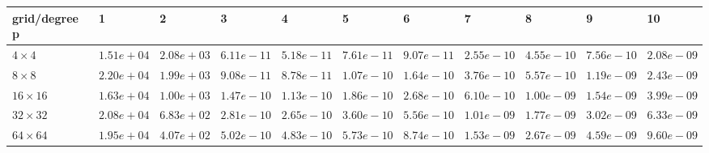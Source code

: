 \begin{tabular}{lllllllllll}
\hline
 grid/degree p   & 1          & 2          & 3          & 4          & 5          & 6          & 7          & 8          & 9          & 10         \\
\hline
 $4 \times 4$    & $1.51e+04$ & $2.08e+03$ & $6.11e-11$ & $5.18e-11$ & $7.61e-11$ & $9.07e-11$ & $2.55e-10$ & $4.55e-10$ & $7.56e-10$ & $2.08e-09$ \\
 $8 \times 8$    & $2.20e+04$ & $1.99e+03$ & $9.08e-11$ & $8.78e-11$ & $1.07e-10$ & $1.64e-10$ & $3.76e-10$ & $5.57e-10$ & $1.19e-09$ & $2.43e-09$ \\
 $16 \times 16$  & $1.63e+04$ & $1.00e+03$ & $1.47e-10$ & $1.13e-10$ & $1.86e-10$ & $2.68e-10$ & $6.10e-10$ & $1.00e-09$ & $1.54e-09$ & $3.99e-09$ \\
 $32 \times 32$  & $2.08e+04$ & $6.83e+02$ & $2.81e-10$ & $2.65e-10$ & $3.60e-10$ & $5.56e-10$ & $1.01e-09$ & $1.77e-09$ & $3.02e-09$ & $6.33e-09$ \\
 $64 \times 64$  & $1.95e+04$ & $4.07e+02$ & $5.02e-10$ & $4.83e-10$ & $5.73e-10$ & $8.74e-10$ & $1.53e-09$ & $2.67e-09$ & $4.59e-09$ & $9.60e-09$ \\
\hline
\end{tabular}